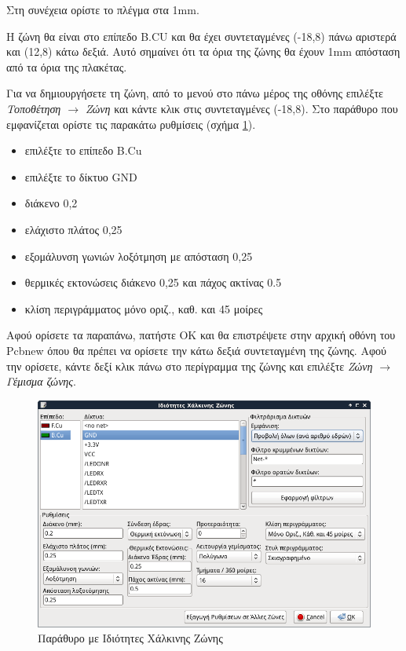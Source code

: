 \documentclass[a4paper]{article}
\begin{document}
Στη συνέχεια ορίστε το πλέγμα στα 1mm.

Η ζώνη θα είναι στο επίπεδο B.CU και θα έχει συντεταγμένες (-18,8) πάνω αριστερά και (12,8) κάτω δεξιά. Αυτό σημαίνει ότι τα όρια της ζώνης θα έχουν 1mm απόσταση από τα όρια της πλακέτας.

Για να δημιουργήσετε τη ζώνη, από το μενού στο πάνω μέρος της οθόνης επιλέξτε \textit{Τοποθέτηση $\rightarrow$ Ζώνη} και κάντε κλικ στις συντεταγμένες (-18,8). Στο παράθυρο που εμφανίζεται ορίστε τις παρακάτω ρυθμίσεις (σχήμα \ref{fig:pcb-wind-gndzone}).


\begin{itemize}
    \item επιλέξτε το επίπεδο B.Cu
    \item επιλέξτε το δίκτυο GND
    \item διάκενο 0,2
    \item ελάχιστο πλάτος 0,25
    \item εξομάλυνση γωνιών λοξότμηση με απόσταση 0,25
    \item θερμικές εκτονώσεις διάκενο 0,25 και πάχος ακτίνας 0.5
    \item κλίση περιγράμματος μόνο οριζ., καθ. και 45 μοίρες
\end{itemize}

Αφού ορίσετε τα παραπάνω, πατήστε ΟΚ και θα επιστρέψετε στην αρχική οθόνη του Pcbnew όπου θα πρέπει να ορίσετε την κάτω δεξιά συντεταγμένη της ζώνης. Αφού την ορίσετε, κάντε δεξί κλικ πάνω στο περίγραμμα της ζώνης και επιλέξτε \textit{Ζώνη $\rightarrow$ Γέμισμα ζώνης}.

\begin{figure}
  \begin{center}
    \includegraphics[width=.9\textwidth]{img/pcb-wind-gndzone.png}
    \caption{Παράθυρο με Ιδιότητες Χάλκινης Ζώνης}
    \label{fig:pcb-wind-gndzone}
  \end{center}
\end{figure}
\end{document}
